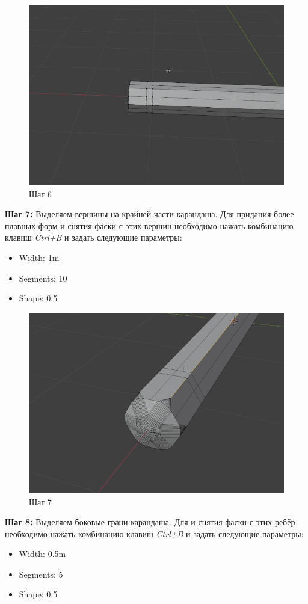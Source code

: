 \documentclass[areasetadvanced]{scrartcl}
\begin{document}
\begin{figure}[H]
    \label{4} 
    \centering
    \includegraphics[width=0.6\linewidth]{pen/6.png}
    \caption{Шаг 6}
\end{figure}


\par \textbf{Шаг 7:} Выделяем вершины на крайней части карандаша. Для придания более плавных форм и снятия фаски с этих вершин необходимо нажать комбинацию клавиш \textit{Ctrl+B} и задать следующие параметры:
\begin{itemize}
    \item Width: 1m
    \item Segments: 10
    \item Shape: 0.5
\end{itemize}

\begin{figure}[H]
    \label{4} 
    \centering
    \includegraphics[width=0.6\linewidth]{pen/7.png}
    \caption{Шаг 7}
\end{figure} 


\par \textbf{Шаг 8:} Выделяем боковые грани карандаша. Для и снятия фаски с этих ребёр необходимо нажать комбинацию клавиш \textit{Ctrl+B} и задать следующие параметры:
\begin{itemize}
    \item Width: 0.5m
    \item Segments: 5
    \item Shape: 0.5
\end{itemize}
\end{document}
